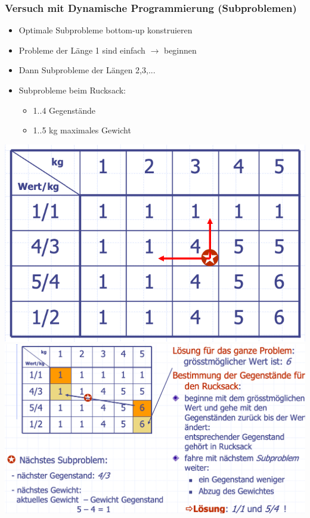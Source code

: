 \subsubsection{Versuch mit Dynamische Programmierung (Subproblemen)}
\begin{itemize}
    \item Optimale Subprobleme bottom-up konstruieren
    \item Probleme der Länge 1 sind einfach $\rightarrow$ beginnen
    \item Dann Subprobleme der Längen 2,3,...
    \item Subprobleme beim Rucksack:
    \begin{itemize}
        \item 1..4 Gegenstände
        \item 1..5 kg maximales Gewicht
    \end{itemize}
\end{itemize}
\vspace{-8pt}
\begin{center}
    \includegraphics[scale=.2]{graphic/10 DynamicProgramming/Dynamische Programmierung.png}
    \includegraphics[scale=.2]{graphic/10 DynamicProgramming/Dynamische Programmierung2.png}
\end{center}
\vspace{-8pt}

